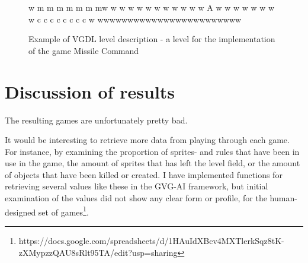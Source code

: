 \documentclass[a4paper,titlepage,final]{report}
\begin{document}

\begin{figure}[!ht]
\centering
\begin{vgdldesc}[linewidth=14cm]
w    m  m   m  m  m m mw
w                      w
w                      w
w                      w
w                      w
w                      w
w           A          w
w                      w
w                      w
w                      w
w   c c c c c c c c    w
wwwwwwwwwwwwwwwwwwwwwwww
\end{vgdldesc}
\caption{Example of VGDL level description - a level for the implementation of the game Missile Command}
\label{fig:evolved_vgdlgame_level}
\end{figure}





\section{Discussion of results}
\label{sec_task2discussion}
The resulting games are unfortunately pretty bad.

It would be interesting to retrieve more data from playing through each game.
For instance, by examining the proportion of sprites- and rules that have been in use in the game, the amount of sprites that has left the level field, or the amount of objects that have been killed or created.
I have implemented functions for retrieving several values like these in the GVG-AI framework, but initial examination of the values did not show any clear form or profile, for the human-designed set of games\footnote{https://docs.google.com/spreadsheets/d/1HAuIdXBcv4MXTlerkSqz8tK-zXMypzzQAU8sRlt95TA/edit?usp=sharing}.



\end{document}
